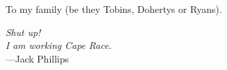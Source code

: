 %
\begin{frontmatter}

%
%
\makefrontmatter

%
%
%
%
%
%
\begin{dedication}
  To my family (be they Tobins, Dohertys or Ryans).
\end{dedication}


%
%



%
%
\begin{epigraph} %
  \emph{Shut up!\\
  I am working Cape Race.}\\
  ---Jack Phillips
\end{epigraph}

%


%
\tableofcontents
\listoffigures  %




\end{frontmatter}
